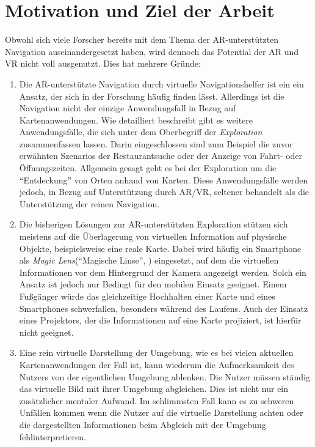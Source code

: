 \section{Motivation und Ziel der Arbeit}
Obwohl sich viele Forscher bereits mit dem Thema der \gls{AR}-unterstützten Navigation auseinandergesetzt haben, wird dennoch das Potential der \gls{AR} und \gls{VR} nicht voll ausgenutzt.
Dies hat mehrere Gründe:
\begin{enumerate}
\item Die \gls{AR}-unterstützte Navigation durch virtuelle Navigationshelfer ist ein ein Ansatz, der sich in der Forschung häufig finden lässt.
Allerdings ist die Navigation nicht der einzige Anwendungsfall in Bezug auf Kartenanwendungen.
Wie \textcite{Reichenbacher2001} detailliert beschreibt gibt es weitere Anwendungsfälle, die sich unter dem Oberbegriff der \emph{Exploration} zusammenfassen lassen.
Darin eingeschlossen sind zum Beispiel die zuvor erwähnten Szenarios der Restaurantsuche oder der Anzeige von Fahrt- oder Öffnungszeiten.
Allgemein gesagt geht es bei der Exploration um die \enquote{Entdeckung} von Orten anhand von Karten.
Diese Anwendungsfälle werden jedoch, in Bezug auf Unterstützung durch \gls{AR}/\gls{VR}, seltener behandelt als die Unterstützung der reinen Navigation.

\item Die bisherigen Lösungen zur \gls{AR}-unterstützten Exploration stützen sich meistens auf die Überlagerung von virtuellen Information auf physische Objekte, beispielsweise eine reale Karte.
Dabei wird häufig ein Smartphone als \emph{Magic Lens}(\enquote{Magische Linse}, \cite{Bier1994}) eingesetzt, auf dem die virtuellen Informationen vor dem Hintergrund der Kamera angezeigt werden.
Solch ein Ansatz ist jedoch nur Bedingt für den mobilen Einsatz geeignet.
Einem Fußgänger würde das gleichzeitige Hochhalten einer Karte und eines Smartphones schwerfallen, besonders während des Laufens.
Auch der Einsatz eines Projektors, der die Informationen auf eine Karte projiziert, ist hierfür nicht geeignet.

\item Eine rein virtuelle Darstellung der Umgebung, wie es bei vielen aktuellen Kartenanwendungen der Fall ist, kann wiederum die Aufmerksamkeit des Nutzers von der eigentlichen Umgebung ablenken.
Die Nutzer müssen ständig das virtuelle Bild mit ihrer Umgebung abgleichen.
Dies ist nicht nur ein zusätzlicher mentaler Aufwand.
Im schlimmsten Fall kann es zu schweren Unfällen kommen wenn die Nutzer auf die virtuelle Darstellung achten oder die dargestellten Informationen beim Abgleich mit der Umgebung fehlinterpretieren.


\end{enumerate}
